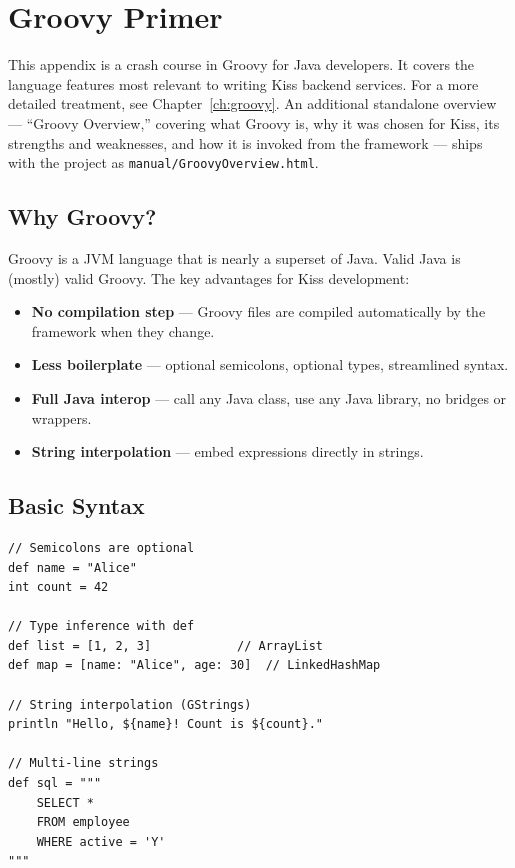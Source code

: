 \chapter{Groovy Primer}
\label{ch:groovy-primer}

This appendix is a crash course in Groovy for Java developers.  It covers the language features most relevant to writing Kiss backend services.  For a more detailed treatment, see Chapter~\ref{ch:groovy}.  An additional standalone overview --- ``Groovy Overview,'' covering what Groovy is, why it was chosen for Kiss, its strengths and weaknesses, and how it is invoked from the framework --- ships with the project as \texttt{manual/\allowbreak{}GroovyOverview.html}.

\section{Why Groovy?}
\label{sec:gp-why}

Groovy is a JVM language that is nearly a superset of Java.  Valid Java is (mostly) valid Groovy.  The key advantages for Kiss development:

\begin{itemize}
  \item \textbf{No compilation step} --- Groovy files are compiled automatically by the framework when they change.
  \item \textbf{Less boilerplate} --- optional semicolons, optional types, streamlined syntax.
  \item \textbf{Full Java interop} --- call any Java class, use any Java library, no bridges or wrappers.
  \item \textbf{String interpolation} --- embed expressions directly in strings.
\end{itemize}

\section{Basic Syntax}
\label{sec:gp-syntax}

\begin{lstlisting}[style=groovy]
// Semicolons are optional
def name = "Alice"
int count = 42

// Type inference with def
def list = [1, 2, 3]            // ArrayList
def map = [name: "Alice", age: 30]  // LinkedHashMap

// String interpolation (GStrings)
println "Hello, ${name}! Count is ${count}."

// Multi-line strings
def sql = """
    SELECT *
    FROM employee
    WHERE active = 'Y'
"""
\end{lstlisting}

